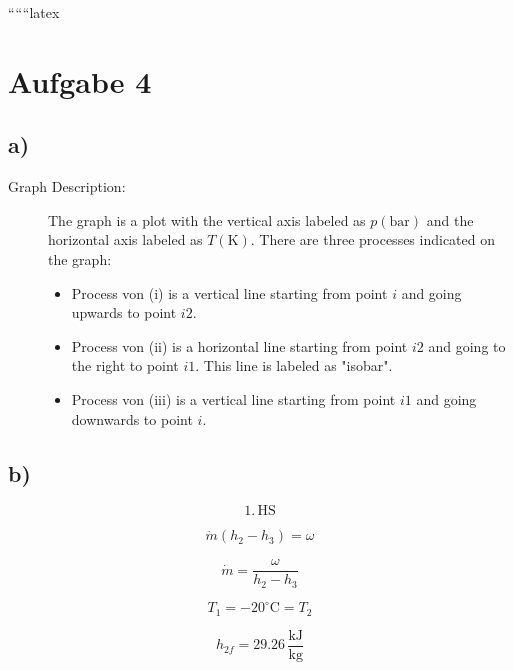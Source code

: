 
``````latex


\section*{Aufgabe 4}

\subsection*{a)}

\begin{description}
    \item[Graph Description:] The graph is a plot with the vertical axis labeled as \( p(\text{bar}) \) and the horizontal axis labeled as \( T(\text{K}) \). There are three processes indicated on the graph:
    \begin{itemize}
        \item Process von (i) is a vertical line starting from point \( i \) and going upwards to point \( i2 \).
        \item Process von (ii) is a horizontal line starting from point \( i2 \) and going to the right to point \( i1 \). This line is labeled as "isobar".
        \item Process von (iii) is a vertical line starting from point \( i1 \) and going downwards to point \( i \).
    \end{itemize}
\end{description}

\subsection*{b)}

\begin{equation*}
    1. \, \text{HS}
\end{equation*}

\begin{equation*}
    \dot{m} (h_2 - h_3) = \omega
\end{equation*}

\begin{equation*}
    \dot{m} = \frac{\omega}{h_2 - h_3}
\end{equation*}

\begin{equation*}
    T_1 = -20^\circ \text{C} = T_2
\end{equation*}

\begin{equation*}
    h_{2f} = 29.26 \, \frac{\text{kJ}}{\text{kg}}
\end{equation*}

